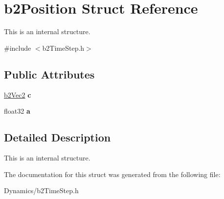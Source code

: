 \hypertarget{structb2Position}{}\section{b2\+Position Struct Reference}
\label{structb2Position}


This is an internal structure.  




{\ttfamily \#include $<$b2\+Time\+Step.\+h$>$}

\subsection*{Public Attributes}
\begin{DoxyCompactItemize}
\item 
\mbox{\label{structb2Position_a64b6d764d272385f84e4cac5ceb5af27}} 
\mbox{\hyperlink{structb2Vec2}{b2\+Vec2}} {\bfseries c}
\item 
\mbox{\label{structb2Position_a19d9362011e8c080059ac7f692cc7d8f}} 
float32 {\bfseries a}
\end{DoxyCompactItemize}


\subsection{Detailed Description}
This is an internal structure. 

The documentation for this struct was generated from the following file\+:\begin{DoxyCompactItemize}
\item 
Dynamics/b2\+Time\+Step.\+h\end{DoxyCompactItemize}
